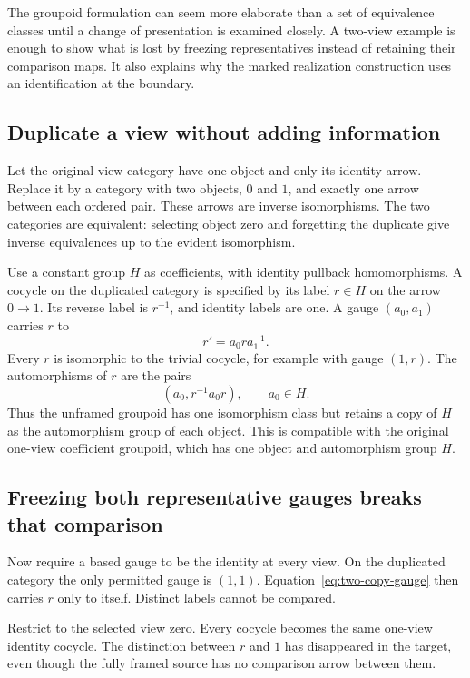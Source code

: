 \label{sec:boundary-lab}
The groupoid formulation can seem more elaborate than a set of equivalence classes until a change of presentation is examined closely. A two-view example is enough to show what is lost by freezing representatives instead of retaining their comparison maps. It also explains why the marked realization construction uses an identification at the boundary.

\subsection{Duplicate a view without adding information}
Let the original view category have one object and only its identity arrow. Replace it by a category with two objects, \(0\) and \(1\), and exactly one arrow between each ordered pair. These arrows are inverse isomorphisms. The two categories are equivalent: selecting object zero and forgetting the duplicate give inverse equivalences up to the evident isomorphism.

Use a constant group \(H\) as coefficients, with identity pullback homomorphisms. A cocycle on the duplicated category is specified by its label \(r\in H\) on the arrow \(0\to1\). Its reverse label is \(r^{-1}\), and identity labels are one. A gauge \((a_0,a_1)\) carries \(r\) to
\begin{equation}\label{eq:two-copy-gauge}
 r'=a_0ra_1^{-1}.
\end{equation}
Every \(r\) is isomorphic to the trivial cocycle, for example with gauge \((1,r)\). The automorphisms of \(r\) are the pairs
\[
 (a_0,r^{-1}a_0r),\qquad a_0\in H.
\]
Thus the unframed groupoid has one isomorphism class but retains a copy of \(H\) as the automorphism group of each object. This is compatible with the original one-view coefficient groupoid, which has one object and automorphism group \(H\).

\subsection{Freezing both representative gauges breaks that comparison}
Now require a based gauge to be the identity at every view. On the duplicated category the only permitted gauge is \((1,1)\). Equation~\eqref{eq:two-copy-gauge} then carries \(r\) only to itself. Distinct labels cannot be compared.

Restrict to the selected view zero. Every cocycle becomes the same one-view identity cocycle. The distinction between \(r\) and \(1\) has disappeared in the target, even though the fully framed source has no comparison arrow between them.


